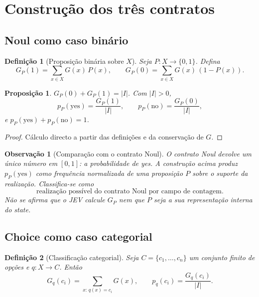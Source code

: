 \documentclass[11pt,a4paper]{article}
\newtheorem{definicao}{Definição}
\newtheorem{proposicao}{Proposição}
\newtheorem{observacao}{Observação}
\begin{document}
\section{Construção dos três contratos}

\subsection{Noul como caso binário}

\begin{definicao}[Proposição binária sobre \(X\)]
\label{def:P}
Seja \(P\colon X\to\{0,1\}\). Defina
\[
G_P(1)=\sum_{x\in X}G(x)\,P(x),\qquad
G_P(0)=\sum_{x\in X}G(x)\,(1-P(x)).
\]
\end{definicao}

\begin{proposicao}
\label{prop:noul-gq}
\(G_P(0)+G_P(1)=\lvert I\rvert\). Com \(\lvert I\rvert>0\),
\[
p_P(\mathrm{yes})=\frac{G_P(1)}{\lvert I\rvert},\qquad
p_P(\mathrm{no})=\frac{G_P(0)}{\lvert I\rvert},
\]
e \(p_P(\mathrm{yes})+p_P(\mathrm{no})=1\).
\end{proposicao}

\begin{proof}
Cálculo directo a partir das definições e da conservação de \(G\).
\end{proof}

\begin{observacao}[Comparação com o contrato Noul]
\label{obs:noul}
O contrato Noul devolve um único número em \([0,1]\): a probabilidade de
\emph{yes}. A construção acima produz \(p_P(\mathrm{yes})\) como frequência
normalizada de uma proposição \(P\) sobre o suporte da realização.
Classifica-se como
\[
\boxed{\text{realização possível do contrato Noul por campo de contagem.}}
\]
Não se afirma que o JEV calcule \(G_P\) nem que \(P\) seja a sua representação
interna do \emph{state}.
\end{observacao}

\subsection{Choice como caso categorial}

\begin{definicao}[Classificação categorial]
\label{def:q-choice}
Seja \(C=\{c_1,\dots,c_n\}\) um conjunto finito de opções e
\(q\colon X\to C\). Então
\[
G_q(c_i)=\sum_{x:\,q(x)=c_i}G(x),\qquad
p_q(c_i)=\frac{G_q(c_i)}{\lvert I\rvert}.
\]
\end{definicao}
\end{document}
